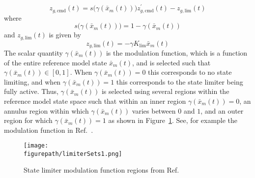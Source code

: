 \begin{equation}
  \label{eqn.zcmdlimited}
  z_{g,\text{cmd}}(t) = s\bigr(\gamma(\bar{x}_{m}(t))\bigr)z_{g,\text{cmd}}^{\prime}(t) - z_{g,\text{lim}}(t)
\end{equation}
where
\begin{equation}
  \label{eqn.sofgamma}
  s\bigr(\gamma(\bar{x}_{m}(t))\bigr) = 1-\gamma(\bar{x}_{m}(t))
\end{equation}
 and $z_{g,\text{lim}}(t)$ is given by
\begin{equation}
  \label{eqn.zglim}
  z_{g,\text{lim}}(t) = -\gamma K_{\text{lim}}\bar{x}_{m}(t)
\end{equation}
The scalar quantity $\gamma(\bar{x}_{m}(t))$ is the modulation function, which is a function of the entire reference model state $\bar{x}_{m}(t)$, and is selected such that $\gamma(\bar{x}_{m}(t))\in[0,1]$.
When $\gamma(\bar{x}_{m}(t))=0$ this corresponds to no state limiting, and when $\gamma(\bar{x}_{m}(t))=1$ this corresponds to the state limiter being fully active.
Thus, $\gamma(\bar{x}_{m}(t))$ is selected using several regions within the reference model state space such that within an inner region $\gamma(\bar{x}_{m}(t))=0$, an annulus region within which $\gamma(\bar{x}_{m}(t))$ varies between $0$ and $1$, and an outer region for which $\gamma(\bar{x}_{m}(t))=1$ as shown in Figure~\ref{fig.modulationFunction}.
See, for example the modulation function in Ref.\ \cite{lavretskywise.book.2013}.

\begin{figure}[H]
  \begin{center}
    \texttt{[image: \\figurepath/limiterSets1.png]}
    \vspace{-0.1in}
    \caption{State limiter modulation function regions from Ref.\cite{lavretsky.statelimiting.2010}\label{fig.modulationFunction}}
  \end{center}
\end{figure}

